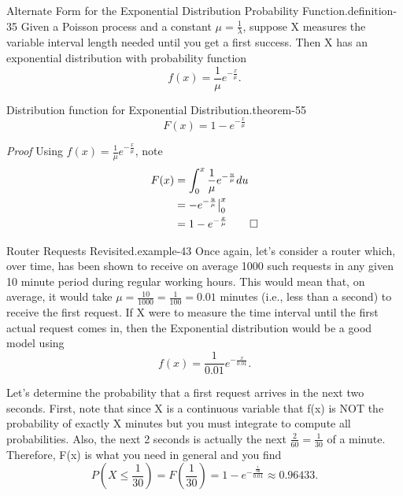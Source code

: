 \documentclass[10pt,]{book}
\makeatletter
\renewcommand*{\proofname}{Proof}
\renewenvironment{proof}[1][\proofname]{\par
  \pushQED{\qed}%
  \normalfont \topsep6\p@\@plus6\p@\relax
  \trivlist
  \item\relax
    {\itshape
    #1\@addpunct{.}}\hspace\labelsep\ignorespaces
}{%
  \popQED\endtrivlist\@endpefalse
}
\numberwithin{equation}{section}
\makeatother
\begin{document}
\begin{definition}{Alternate Form for the Exponential Distribution Probability Function.}{definition-35}%
\hypertarget{p-1089}{}%
Given a Poisson process and a constant \(\mu = \frac{1}{\lambda}\), suppose X measures the variable interval length needed until you get a first success.  Then X has an exponential distribution with probability function%
\begin{equation*}
f(x) = \frac{1}{\mu} e^{-\frac{x}{\mu}}.
\end{equation*}
%
\end{definition}
%
\par
\hypertarget{p-1090}{}%
\begin{theorem}{Distribution function for Exponential Distribution.}{}{theorem-55}%
\hypertarget{p-1091}{}%
%
\begin{equation*}
F(x) = 1 - e^{-\frac{x}{\mu}}
\end{equation*}
%
\end{theorem}
\begin{proof}\hypertarget{proof-58}{}
\hypertarget{p-1092}{}%
Using \(f(x) = \frac{1}{\mu} e^{-\frac{x}{\mu}}\), note%
\begin{align*}
F(x) & = \int_0^x \frac{1}{\mu} e^{-\frac{u}{\mu}} du\\
& =  - e^{-\frac{u}{\mu}} \big |_0^x\\
& = 1 - e^{-\frac{x}{\mu}}\qedhere
\end{align*}
%
\end{proof}
%
\par
\hypertarget{p-1093}{}%
\begin{example}{Router Requests Revisited.}{example-43}%
\hypertarget{p-1094}{}%
Once again, let's consider a router which, over time, has been shown to receive on average 1000 such requests in any given 10 minute period during regular working hours. This would mean that, on average, it would take \(\mu = \frac{10}{1000} = \frac{1}{100} = 0.01\) minutes (i.e., less than a second) to receive the first request. If X were to measure the time interval until the first actual request comes in, then the Exponential distribution would be a good model using%
\begin{equation*}
f(x) = \frac{1}{0.01} e^{-\frac{x}{0.01}}.
\end{equation*}
%
\par
\hypertarget{p-1095}{}%
Let's determine the probability that a first request arrives in the next two seconds. First, note that since X is a continuous variable that f(x) is NOT the probability of exactly X minutes but you must integrate to compute all probabilities. Also, the next 2 seconds is actually the next \(\frac{2}{60} = \frac{1}{30}\) of a minute. Therefore, F(x) is what you need in general and you find%
\begin{equation*}
P(X \le \frac{1}{30}) = F(\frac{1}{30}) = 1 - e^{-\frac{\frac{1}{30}}{0.01}} \approx 0.96433.
\end{equation*}
%
\end{example}
\end{document}

